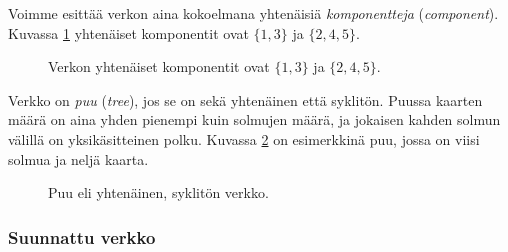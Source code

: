 
Voimme esittää verkon aina kokoelmana yhtenäisiä \emph{komponentteja}
(\emph{component}).
Kuvassa \ref{fig:veryht} yhtenäiset komponentit
ovat $\{1,3\}$ ja $\{2,4,5\}$.

\begin{figure}
\center
\begin{center}
\end{center}
\caption{Verkon yhtenäiset komponentit ovat $\{1,3\}$ ja $\{2,4,5\}$.}
\label{fig:veryht}
\end{figure}


Verkko on \emph{puu} (\emph{tree}), jos se on sekä yhtenäinen
että syklitön.
Puussa kaarten määrä on aina yhden pienempi
kuin solmujen määrä, ja jokaisen kahden solmun
välillä on yksikäsitteinen polku.
Kuvassa \ref{fig:verpuu} on esimerkkinä puu,
jossa on viisi solmua ja neljä kaarta.

\begin{figure}
\center
\begin{center}
\end{center}
\caption{Puu eli yhtenäinen, syklitön verkko.}
\label{fig:verpuu}
\end{figure}

\subsubsection{Suunnattu verkko}

